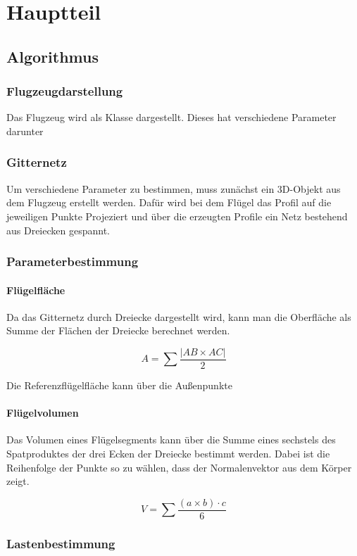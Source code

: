 \chapter{Hauptteil}


\section[short]{Algorithmus}

\subsection[short]{Flugzeugdarstellung}


Das Flugzeug wird als Klasse dargestellt. Dieses hat verschiedene Parameter darunter 

\subsection[short]{Gitternetz}

Um verschiedene Parameter zu bestimmen, muss zunächst ein 3D-Objekt aus dem Flugzeug erstellt werden. Dafür wird bei dem Flügel das Profil auf die jeweiligen Punkte Projeziert und über die erzeugten Profile ein Netz bestehend aus Dreiecken gespannt.

\subsection{Parameterbestimmung}

\subsubsection*{Flügelfläche}
Da das Gitternetz durch Dreiecke dargestellt wird, kann man die Oberfläche als Summe der Flächen der Dreiecke berechnet werden.

$$
A = \sum \frac{|AB \times AC|}{2}
$$

Die Referenzflügelfläche kann über die Außenpunkte 

\subsubsection[short]{Flügelvolumen}

Das Volumen eines Flügelsegments kann über die Summe eines sechstels des Spatproduktes der drei Ecken der Dreiecke bestimmt werden. Dabei ist die Reihenfolge der Punkte so zu wählen, dass der Normalenvektor aus dem Körper zeigt.

$$
V = \sum \frac{(a\times b )\cdot c}{6}
$$

\subsection[short]{Lastenbestimmung}


